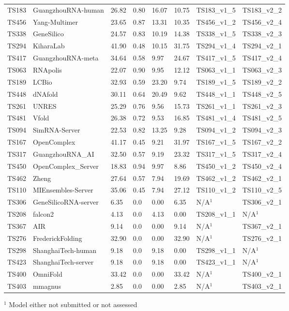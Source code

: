 \begin{table}[ht]
{\begin{tabular}{llllllll}
TS183 & GuangzhouRNA-human & 26.82 & 0.80 & 16.07 & 10.75 & TS183\_v1\_5 & TS183\_v2\_2 \\ 
TS456 & Yang-Multimer & 23.65 & 0.87 & 13.31 & 10.35 & TS456\_v1\_2 & TS456\_v2\_4 \\ 
TS338 & GeneSilico & 24.57 & 0.83 & 10.19 & 14.38 & TS338\_v1\_5 & TS338\_v2\_3 \\ 
TS294 & KiharaLab & 41.90 & 0.48 & 10.15 & 31.75 & TS294\_v1\_4 & TS294\_v2\_1 \\ 
TS417 & GuangzhouRNA-meta & 34.64 & 0.58 & 9.97 & 24.67 & TS417\_v1\_5 & TS417\_v2\_4 \\ 
TS063 & RNApolis & 22.07 & 0.90 & 9.95 & 12.12 & TS063\_v1\_1 & TS063\_v2\_3 \\ 
TS189 & LCBio & 32.93 & 0.59 & 23.20 & 9.74 & TS189\_v1\_5 & TS189\_v2\_2 \\ 
TS448 & dNAfold & 30.11 & 0.64 & 20.49 & 9.62 & TS448\_v1\_1 & TS448\_v2\_5 \\ 
TS261 & UNRES & 25.29 & 0.76 & 9.56 & 15.73 & TS261\_v1\_1 & TS261\_v2\_3 \\ 
TS481 & Vfold & 26.38 & 0.72 & 9.53 & 16.85 & TS481\_v1\_4 & TS481\_v2\_5 \\ 
TS094 & SimRNA-Server & 22.53 & 0.82 & 13.25 & 9.28 & TS094\_v1\_2 & TS094\_v2\_3 \\ 
TS167 & OpenComplex & 41.17 & 0.45 & 9.21 & 31.97 & TS167\_v1\_5 & TS167\_v2\_2 \\ 
TS317 & GuangzhouRNA\_AI & 32.50 & 0.57 & 9.19 & 23.32 & TS317\_v1\_5 & TS317\_v2\_4 \\ 
TS450 & OpenComplex\_Server & 18.83 & 0.94 & 9.97 & 8.86 & TS450\_v1\_2 & TS450\_v2\_4 \\ 
TS462 & Zheng & 27.64 & 0.57 & 7.94 & 19.69 & TS462\_v1\_2 & TS462\_v2\_1 \\ 
TS110 & MIEnsembles-Server & 35.06 & 0.45 & 7.94 & 27.12 & TS110\_v1\_2 & TS110\_v2\_5 \\ 
TS306 & GeneSilicoRNA-server & 6.35 & 0.0 & 0.00 & 6.35 & N/A$^{1}$ & TS306\_v2\_1 \\ 
TS208 & falcon2 & 4.13 & 0.0 & 4.13 & 0.00 & TS208\_v1\_1 & N/A$^{1}$ \\ 
TS367 & AIR & 9.14 & 0.0 & 0.00 & 9.14 & N/A$^{1}$ & TS367\_v2\_1 \\ 
TS276 & FrederickFolding & 32.90 & 0.0 & 0.00 & 32.90 & N/A$^{1}$ & TS276\_v2\_1 \\ 
TS298 & ShanghaiTech-human & 9.18 & 0.0 & 9.18 & 0.00 & TS298\_v1\_1 & N/A$^{1}$ \\ 
TS423 & ShanghaiTech-server & 9.18 & 0.0 & 9.18 & 0.00 & TS423\_v1\_1 & N/A$^{1}$ \\ 
TS400 & OmniFold & 33.42 & 0.0 & 0.00 & 33.42 & N/A$^{1}$ & TS400\_v2\_1 \\ 
TS403 & mmagnus & 2.85 & 0.0 & 0.00 & 2.85 & N/A$^{1}$ & TS403\_v2\_1 \\ 
\bottomrule
\end{tabular}%
}
\begin{flushleft}\footnotesize $^{1}$ Model either not submitted or not assessed\end{flushleft}
\end{table}
